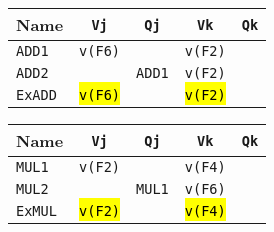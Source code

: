 \begin{enumerate}
    \begin{minipage}[t]{0.43\textwidth}
        \centering
        \begin{adjustbox}{width={\textwidth},totalheight={\textheight},keepaspectratio}
            \begin{tabular}{@{} l | c c c c @{}}
                \toprule
                Name            & \texttt{Vj}           & \texttt{Qj}                       & \texttt{Vk}           & \texttt{Qk}           \\
                \midrule
                \texttt{ADD1}   & \texttt{v(F6)}        &                                   & \texttt{v(F2)}        &                       \\ [.3em]
                \texttt{ADD2}   &                       & \texttt{ADD1}                     & \texttt{v(F2)}        &                       \\
                \cmidrule{1-5}
                \texttt{ExADD}  & \hl{\texttt{v(F6)}}   &                                   & \hl{\texttt{v(F2)}}   &                       \\
                \bottomrule
            \end{tabular}
        \end{adjustbox}
    \end{minipage}
    \hfill
    \begin{minipage}[t]{0.43\textwidth}
        \centering
        \begin{adjustbox}{width={\textwidth},totalheight={\textheight},keepaspectratio}
            \begin{tabular}{@{} l | c c c c @{}}
                \toprule
                Name            & \texttt{Vj}           & \texttt{Qj}           & \texttt{Vk}           & \texttt{Qk}   \\
                \midrule
                \texttt{MUL1}   & \texttt{v(F2)}        &                       & \texttt{v(F4)}        &               \\ [.3em]
                \texttt{MUL2}   &                       & \texttt{MUL1}         & \texttt{v(F6)}        &               \\
                \cmidrule{1-5}
                \texttt{ExMUL}  & \hl{\texttt{v(F2)}}   &                       & \hl{\texttt{v(F4)}}   &               \\
                \bottomrule
            \end{tabular}
        \end{adjustbox}
    \end{minipage}


\end{enumerate}
